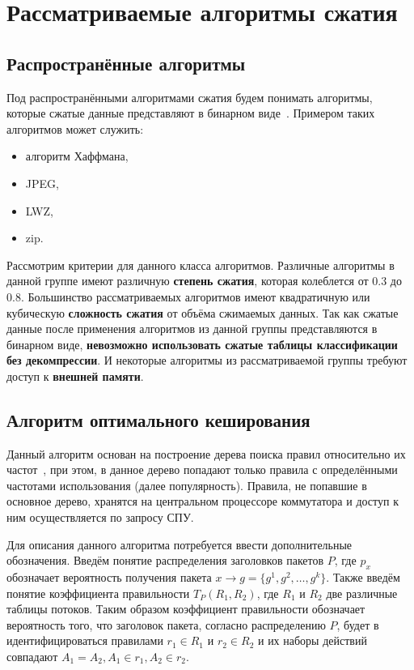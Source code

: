 \documentclass[a4paper, 12pt, titlepage, finall]{extreport}
\begin{document}
    \section{Рассматриваемые алгоритмы сжатия}
        \subsection{Распространённые алгоритмы}
            Под распространёнными алгоритмами сжатия будем понимать алгоритмы, 
            которые сжатые данные представляют в бинарном виде~\cite{kodituwakku2010comparison}. 
            Примером таких алгоритмов может служить:
            \begin{itemize}
                \item алгоритм Хаффмана,
                \item JPEG,
                \item LWZ,
                \item zip.
            \end{itemize}
            
            Рассмотрим критерии для данного класса алгоритмов. Различные алгоритмы в данной группе имеют различную \textbf{степень сжатия}, 
            которая колеблется от 0.3 до 0.8. Большинство рассматриваемых алгоритмов имеют квадратичную или кубическую \textbf{сложность сжатия} 
            от объёма сжимаемых данных. Так как сжатые данные после применения алгоритмов из данной группы представляются в бинарном виде,
            \textbf{невозможно использовать сжатые таблицы классификации без декомпрессии}. И некоторые алгоритмы из рассматриваемой группы требуют доступ к \textbf{внешней памяти}.
        \subsection{Алгоритм оптимального кеширования}
            Данный алгоритм основан на построение дерева поиска правил относительно их частот~\cite{rottenstreich2016optimal}, при этом, в данное дерево
            попадают только правила с определёнными частотами использования (далее популярность). 
            Правила, не попавшие в основное дерево, хранятся на центральном процессоре коммутатора и  доступ к ним осуществляется по запросу СПУ.
            
            Для описания данного алгоритма потребуется ввести дополнительные обозначения. Введём понятие распределения заголовков пакетов \(P\),
            где \(p_x\) обозначает вероятность получения пакета \(x \rightarrow g=\{g^1,g^2,\ldots,g^k\}\).
            Также введём понятие коэффициента правильности \(T_P(R_1, R_2)\), где \(R_1\) и \(R_2\) две различные таблицы потоков. 
            Таким образом коэффициент правильности обозначает вероятность того, что заголовок пакета, согласно распределению \(P\),
            будет в идентифицироваться правилами \(r_1 \in R_1\) и \(r_2 \in R_2\) и их наборы действий совпадают \(A_1 = A_2, A_1 \in r_1, A_2 \in r_2\).
            
\end{document}

